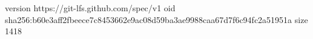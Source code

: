 version https://git-lfs.github.com/spec/v1
oid sha256:b60e3aff2fbeece7c8453662e9ac08d59ba3ae9988caa67d7f6c94fc2a51951a
size 1418
